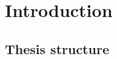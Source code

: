\chapter{Introduction}
\label{chpr:intro}

\bigskip

\section{Thesis structure}




\bigskip
\noindent


\bigskip


